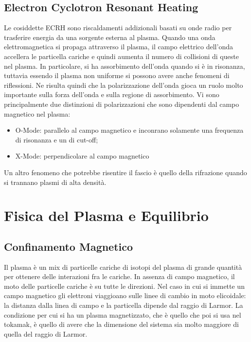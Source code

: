 \documentclass{article}
\begin{document}
\subsection{Electron Cyclotron Resonant Heating}
Le cosiddette ECRH sono riscaldamenti addizionali basati su onde radio per trasferire energia da una sorgente esterna al plasma. Quando una onda elettromagnetica si propaga attraverso il plasma, il campo elettrico dell'onda accellera le particella cariche e quindi aumenta il numero di collisioni di queste nel plasma.\newline
In particolare, si ha assorbimento dell'onda quando si è in risonanza, tuttavia essendo il plasma non uniforme si possono avere anche fenomeni di riflessioni. Ne risulta quindi che la polarizzazione dell'onda gioca un ruolo molto importante sulla forza dell'onda e sulla regione di assorbimento. Vi sono principalmente due distinzioni di polarizzazioni che sono dipendenti dal campo magnetico nel plasma:\begin{itemize}
	\item O-Mode: parallelo al campo magnetico e inconrano solamente una frequenza di risonanza e un di cut-off;
	\item X-Mode: perpendicolare al campo magnetico
\end{itemize}
Un altro fenomeno che potrebbe risentire il fascio è quello della rifrazione quando si trannano plasmi di alta densità.
\section{Fisica del Plasma e Equilibrio}
\subsection{Confinamento Magnetico}
Il plasma è un mix di particelle cariche di isotopi del plasma di grande quantità per ottenere delle interazioni fra le cariche. In assenza di campo magnetico, il moto delle particelle cariche è su tutte le direzioni. Nel caso in cui si immette un campo magnetico gli elettroni viaggioano sulle linee di cambio in moto elicoidale: la distanza dalla linea di campo e la particella dipende dal raggio di Larmor. La condizione per cui si ha un plasma magnetizzato, che è quello che poi si usa nel tokamak, è quello di avere che la dimensione del sistema sia molto maggiore di quella del raggio di Larmor.
\end{document}
